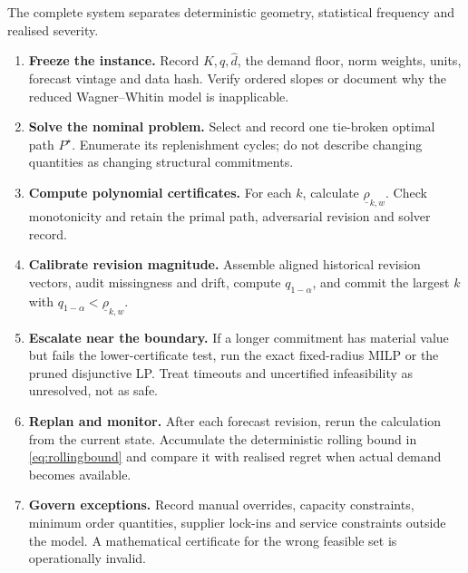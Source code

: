 \documentclass[11pt]{article}
\theoremstyle{definition}
\newcommand{\dhat}{\widehat d}
\begin{document}
The complete system separates deterministic geometry, statistical frequency and realised severity.

\begin{enumerate}[label=\textbf{Step \arabic*.},leftmargin=5.2em,itemsep=0.45em]
\item \textbf{Freeze the instance.} Record $K,q,\dhat$, the demand floor, norm weights, units, forecast vintage and data hash. Verify ordered slopes or document why the reduced Wagner--Whitin model is inapplicable.
\item \textbf{Solve the nominal problem.} Select and record one tie-broken optimal path $P^\star$. Enumerate its replenishment cycles; do not describe changing quantities as changing structural commitments.
\item \textbf{Compute polynomial certificates.} For each $k$, calculate $\underline\rho_{k,w}$. Check monotonicity and retain the primal path, adversarial revision and solver record.
\item \textbf{Calibrate revision magnitude.} Assemble aligned historical revision vectors, audit missingness and drift, compute $q_{1-\alpha}$, and commit the largest $k$ with $q_{1-\alpha}<\underline\rho_{k,w}$.
\item \textbf{Escalate near the boundary.} If a longer commitment has material value but fails the lower-certificate test, run the exact fixed-radius MILP or the pruned disjunctive LP. Treat timeouts and uncertified infeasibility as unresolved, not as safe.
\item \textbf{Replan and monitor.} After each forecast revision, rerun the calculation from the current state. Accumulate the deterministic rolling bound in \eqref{eq:rollingbound} and compare it with realised regret when actual demand becomes available.
\item \textbf{Govern exceptions.} Record manual overrides, capacity constraints, minimum order quantities, supplier lock-ins and service constraints outside the model. A mathematical certificate for the wrong feasible set is operationally invalid.
\end{enumerate}
\end{document}
